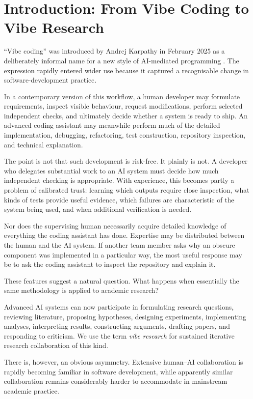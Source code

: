 \section{Introduction: From Vibe Coding to Vibe Research}

``Vibe coding'' was introduced by Andrej Karpathy in February 2025 as a deliberately informal name for a new style of AI-mediated programming \citep{fowler2026vibecoding}. The expression rapidly entered wider use because it captured a recognisable change in software-development practice.

In a contemporary version of this workflow, a human developer may formulate requirements, inspect visible behaviour, request modifications, perform selected independent checks, and ultimately decide whether a system is ready to ship. An advanced coding assistant may meanwhile perform much of the detailed implementation, debugging, refactoring, test construction, repository inspection, and technical explanation.

The point is not that such development is risk-free. It plainly is not. A developer who delegates substantial work to an AI system must decide how much independent checking is appropriate. With experience, this becomes partly a problem of calibrated trust: learning which outputs require close inspection, what kinds of tests provide useful evidence, which failures are characteristic of the system being used, and when additional verification is needed.

Nor does the supervising human necessarily acquire detailed knowledge of everything the coding assistant has done. Expertise may be distributed between the human and the AI system. If another team member asks why an obscure component was implemented in a particular way, the most useful response may be to ask the coding assistant to inspect the repository and explain it.

These features suggest a natural question. What happens when essentially the same methodology is applied to academic research?

Advanced AI systems can now participate in formulating research questions, reviewing literature, proposing hypotheses, designing experiments, implementing analyses, interpreting results, constructing arguments, drafting papers, and responding to criticism. We use the term \emph{vibe research} for sustained iterative research collaboration of this kind.

There is, however, an obvious asymmetry. Extensive human--AI collaboration is rapidly becoming familiar in software development, while apparently similar collaboration remains considerably harder to accommodate in mainstream academic practice.

